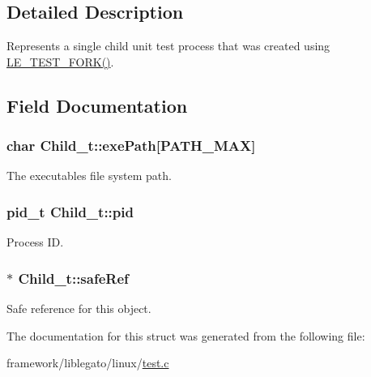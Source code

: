\subsection{Detailed Description}
Represents a single child unit test process that was created using \hyperlink{le__test_8h_ac0c538ca3dfcd072464385b2f7e2776f}{L\+E\+\_\+\+T\+E\+S\+T\+\_\+\+F\+O\+R\+K()}. 

\subsection{Field Documentation}
\subsubsection[{\texorpdfstring{exe\+Path}{exePath}}]{\setlength{\rightskip}{0pt plus 5cm}char Child\+\_\+t\+::exe\+Path\mbox{[}P\+A\+T\+H\+\_\+\+M\+AX\mbox{]}}\hypertarget{struct_child__t_ad9199da1ca5aa7899673a57f82b5f369}{}\label{struct_child__t_ad9199da1ca5aa7899673a57f82b5f369}


The executable\textquotesingle{}s file system path. 

\subsubsection[{\texorpdfstring{pid}{pid}}]{\setlength{\rightskip}{0pt plus 5cm}pid\+\_\+t Child\+\_\+t\+::pid}\hypertarget{struct_child__t_ab946263ddf9466b1f73aa1c65dfcecd5}{}\label{struct_child__t_ab946263ddf9466b1f73aa1c65dfcecd5}


Process ID. 

\subsubsection[{\texorpdfstring{safe\+Ref}{safeRef}}]{$\ast$ Child\+\_\+t\+::safe\+Ref}\hypertarget{struct_child__t_a91127a3c90b52b960e545a21a687b7c2}{}\label{struct_child__t_a91127a3c90b52b960e545a21a687b7c2}


Safe reference for this object. 



The documentation for this struct was generated from the following file\+:\begin{DoxyCompactItemize}
\item 
framework/liblegato/linux/\hyperlink{test_8c}{test.\+c}\end{DoxyCompactItemize}
